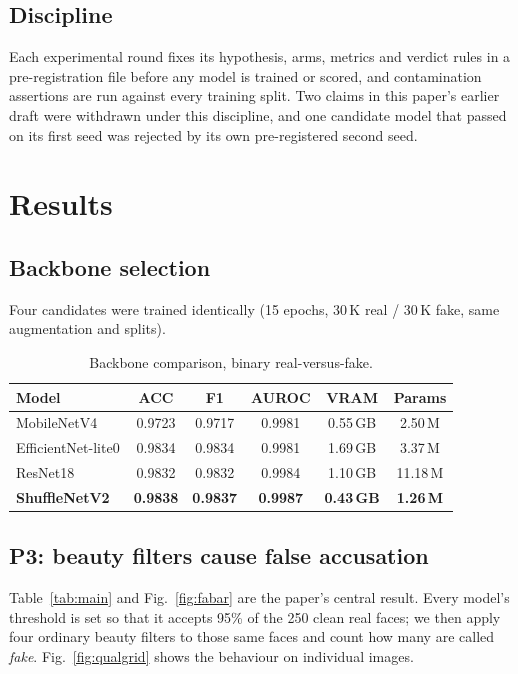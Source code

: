\documentclass[conference]{IEEEtran}
\begin{document}
\subsection{Discipline}
Each experimental round fixes its hypothesis, arms, metrics and verdict rules in a
pre-registration file before any model is trained or scored, and contamination assertions
are run against every training split. Two claims in this paper's earlier draft were
withdrawn under this discipline, and one candidate model that passed on its first seed was
rejected by its own pre-registered second seed.

\section{Results}

\subsection{Backbone selection}
\label{sec:backbone}
Four candidates were trained identically (15 epochs, 30\,K real / 30\,K fake, same
augmentation and splits).

\begin{table}[t]
\caption{Backbone comparison, binary real-versus-fake.}
\label{tab:backbone}
\centering\small
\begin{tabular}{@{}lccccc@{}}
\toprule
Model & ACC & F1 & AUROC & VRAM & Params \\
\midrule
MobileNetV4        & 0.9723 & 0.9717 & 0.9981 & 0.55\,GB & 2.50\,M \\
EfficientNet-lite0 & 0.9834 & 0.9834 & 0.9981 & 1.69\,GB & 3.37\,M \\
ResNet18           & 0.9832 & 0.9832 & 0.9984 & 1.10\,GB & 11.18\,M \\
\textbf{ShuffleNetV2} & \textbf{0.9838} & \textbf{0.9837} & \textbf{0.9987}
                   & \textbf{0.43\,GB} & \textbf{1.26\,M} \\
\bottomrule
\end{tabular}
\end{table}

\subsection{P3: beauty filters cause false accusation}
\label{sec:p3}
Table~\ref{tab:main} and Fig.~\ref{fig:fabar} are the paper's central result. Every model's
threshold is set so that it accepts 95\% of the 250 clean real faces; we then apply four
ordinary beauty filters to those same faces and count how many are called \emph{fake}.
Fig.~\ref{fig:qualgrid} shows the behaviour on individual images.
\end{document}
